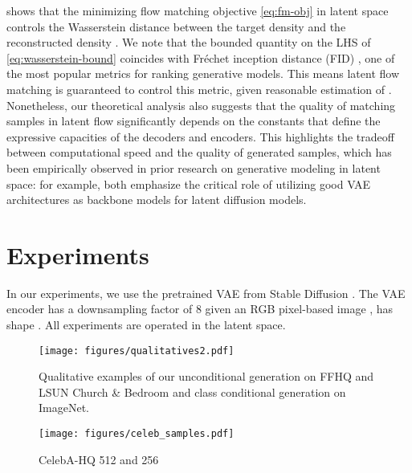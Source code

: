 \documentclass{article}
\theoremstyle{plain}
\theoremstyle{definition}
\theoremstyle{remark}
\begin{document}
 shows that the minimizing flow matching objective \eqref{eq:fm-obj} in latent space controls the Wasserstein distance between the target density  and the reconstructed density .
We note that the bounded quantity on the LHS of \eqref{eq:wasserstein-bound} coincides with Fréchet inception distance (FID) \cite{heusel2017gans}, one of the most popular metrics for ranking generative models. This means latent flow matching is guaranteed to control this metric, given reasonable estimation of .
Nonetheless, our theoretical analysis also suggests that the quality of matching samples in latent flow significantly depends on the constants that define the expressive capacities of the decoders and encoders.
This highlights the tradeoff between computational speed and the quality of generated samples, which has been empirically observed in prior research on generative modeling in latent space:
for example, both \cite{rombach2022high,vahdat2021scorebased} emphasize the critical role of utilizing good VAE architectures as backbone models for latent diffusion models.


\section{Experiments}

In our experiments, we use the pretrained VAE \cite{kingma2013auto} from Stable Diffusion \cite{rombach2022high}. The VAE encoder has a downsampling factor of 8 given an RGB pixel-based image ,  has
shape . All experiments are operated in the latent space.


\begin{figure}[t]
    \centering
    \texttt{[image: figures/qualitatives2.pdf]}
    
    \vspace{-1mm}
    \caption{Qualitative examples of our unconditional generation on FFHQ and LSUN Church \& Bedroom and class conditional generation on ImageNet.}
    \label{fig:qualitatives}
    \vspace{-1mm}
\end{figure}

\begin{figure}
    \centering
    \texttt{[image: figures/celeb\_samples.pdf]}
    \vspace{-1mm}
    \caption{CelebA-HQ 512 and 256}
    \label{fig:celeb_samples}
    \vspace{-5mm}
\end{figure}
\end{document}
